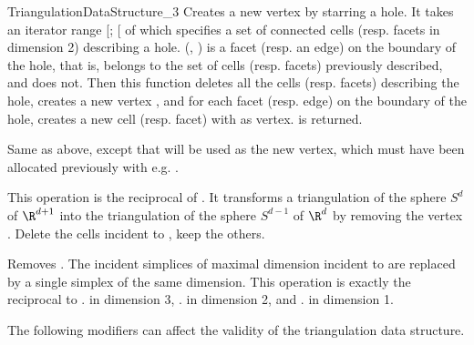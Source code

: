 \begin{ccRefConcept}{TriangulationDataStructure_3}
{Creates a new vertex by starring a hole.  It takes an iterator range
[; [ of  which specifies a set
of connected cells (resp. facets in dimension 2) describing a hole.
(, ) is a facet (resp. an edge) on the boundary of the hole,
that is,  belongs to the set of cells (resp.  facets) previously
described, and  does not.  Then this function deletes
all the cells (resp. facets) describing the hole, creates a new vertex
, and for each facet (resp. edge) on the boundary of the hole, creates
a new cell (resp. facet) with  as vertex.   is returned.
}

{ Same as above, except that  will be used as the new vertex, which
  must have been allocated previously with e.g. .}


{This operation is the reciprocal of .
It transforms a triangulation of the sphere $S^d$ of $\R^{d+1}$ into the
triangulation of the sphere $S^{d-1}$ of $\R^{d}$ by removing the vertex
. Delete the cells incident to , keep the others.
}

{Removes . The incident simplices of maximal dimension incident to
 are replaced by a single simplex of the same dimension. This
operation is exactly the reciprocal to \ccVar. in
dimension 3, \ccVar. in dimension 2, and
\ccVar. in dimension 1.
}


\begin{ccAdvanced}
The following modifiers can affect the validity of the triangulation
data structure.


\end{ccAdvanced}
\end{ccRefConcept}
